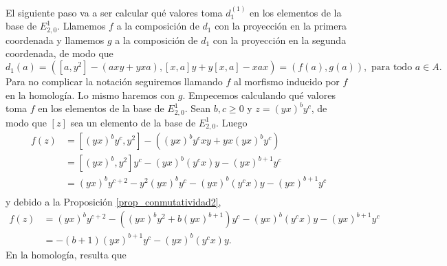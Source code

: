 \documentclass[fleqn,../tesis.tex]{subfiles}
\begin{document}
El siguiente paso va a ser calcular qué valores toma $d_1^{(1)}$ en los elementos de la base de $E^1_{2, 0}$. Llamemos
$f$ a la composición de $d_1$ con la proyección en la primera coordenada y llamemos $g$ a la composición de $d_1$ con la proyección en la segunda coordenada, de modo que
\[
	d_1(a) =  \left(\left[a,y^2\right] - (axy + yxa), \left[x,a\right]y + y\left[x,a\right] - xax\right) = (f(a), g(a)), \text{ para todo } a \in A.
\]
Para no complicar la notación seguiremos llamando $f$ al morfismo inducido por $f$ en la homología. Lo mismo haremos con $g$.
Empecemos calculando qué valores toma $f$ en los elementos de la base de $E^1_{2, 0}$. Sean $b, c \geq 0$ y $z = (yx)^by^c$, de modo que $\left[z\right]$
sea un elemento de la base de $E^1_{2, 0}$. Luego
\begin{align*}
	f(z) &= \left[(yx)^by^c, y^2\right] - \left((yx)^by^cxy + yx(yx)^by^c\right)\\
	&= \left[(yx)^b, y^2\right]y^c - (yx)^b(y^cx)y - (yx)^{b + 1}y^c \\
	&= (yx)^by^{c + 2} - y^2(yx)^by^c - (yx)^b(y^cx)y - (yx)^{b + 1}y^c \\
\end{align*}
y debido a la Proposición \ref{prop_conmutatividad2},
\begin{align*}
	f(z) &= (yx)^by^{c + 2} - ((yx)^by^2 + b(yx)^{b + 1})y^c - (yx)^b(y^cx)y - (yx)^{b + 1}y^c \\
	&= - (b + 1)(yx)^{b + 1}y^c - (yx)^b(y^cx)y.
\end{align*}
En la homología, resulta que
\end{document}
